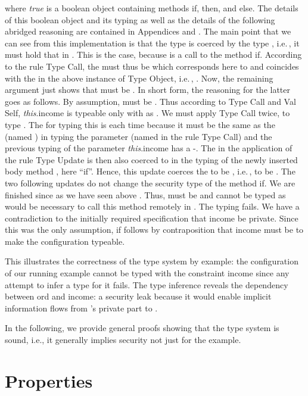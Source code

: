 \documentclass[10pt, conference, compsocconf]{IEEEtran}
\newcommand\ie{i.e.\!\,, }
\begin{document}
{where {\it true} is a boolean object containing methods if, then, and else.
The details of this boolean object and its typing as well as the details of the following
abridged reasoning are contained in Appendices  and .
The main point that we can see from this implementation is that the 
type  is coerced by the type , \ie 
it must hold that  in .
This is the case, because  is a call to the method if. 
According to the rule {\sc Type Call}, the  must thus be  
which corresponds here to  and coincides with the  
 in the above instance of {\sc Type Object}, \ie .
Now, the remaining argument just shows that  must be .
In short form, the reasoning for the latter goes as follows. 
By assumption,  must be . Thus
according to {\sc Type Call} and {\sc Val Self}, {\it this}.income is typeable 
only with  as . We must apply {\sc Type Call} twice, to type
.
The  for typing this is  each time because it must be the 
same as the  (named ) in typing the parameter (named  in the 
rule {\sc Type Call}) and the previous typing of the parameter 
{\it this}.income has a -.
The  in the application of the rule {\sc Type Update} is then also coerced
to  in the typing of the newly inserted body method , here ``if''. 
Hence, this update coerces the   to be , \ie 
 to be . 
The two following updates do not change the security type of the method if.
We are finished since as we have seen above 
. Thus,  must be  and cannot be
typed  as would be necessary to call this method remotely in .
The typing fails. We have a contradiction to the initially required specification 
that income be private. Since this was the only assumption, if follows by contraposition
that income must be  to make the configuration typeable.

This illustrates the correctness of the type system by example: the configuration  of 
our running example cannot be typed with the constraint income  since any 
attempt to infer a type  
for it fails.
The type inference reveals the dependency between ord and income: a security
leak because it would enable implicit information flows from 's private part to
.

In the following, we provide general proofs showing that the type system is sound, i.e., it
generally implies security not just for the example.


\section{Properties}
\label{sec:props}

}
\end{document}
